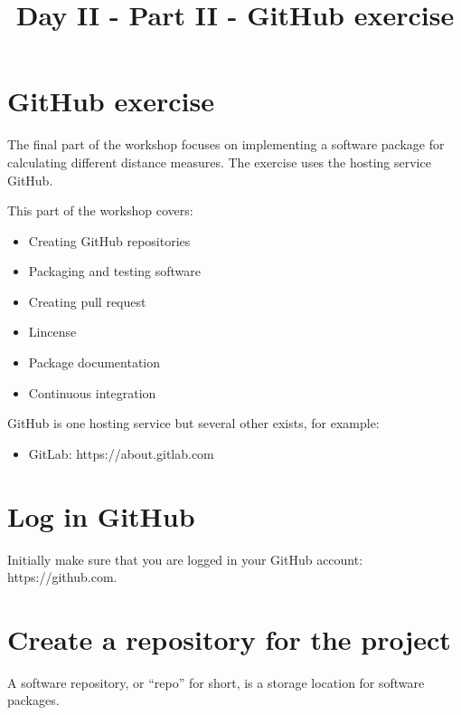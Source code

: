 \documentclass[11pt]{article}
\title{Day II - Part II - GitHub exercise}
\providecommand{\tightlist}{%
      \setlength{\itemsep}{0pt}\setlength{\parskip}{0pt}}
\begin{document}
    
    \maketitle
    
    

    
    \hypertarget{github-exercise}{%
\section{GitHub exercise}\label{github-exercise}}

The final part of the workshop focuses on implementing a software
package for calculating different distance measures. The exercise uses
the hosting service GitHub.

This part of the workshop covers:

\begin{itemize}
\tightlist
\item
  Creating GitHub repositories
\item
  Packaging and testing software
\item
  Creating pull request
\item
  Lincense
\item
  Package documentation
\item
  Continuous integration
\end{itemize}

    GitHub is one hosting service but several other exists, for example:

\begin{itemize}
\tightlist
\item
  GitLab: https://about.gitlab.com
\end{itemize}

    \hypertarget{log-in-github}{%
\section{Log in GitHub}\label{log-in-github}}

Initially make sure that you are logged in your GitHub account:
https://github.com.

    \hypertarget{create-a-repository-for-the-project}{%
\section{Create a repository for the
project}\label{create-a-repository-for-the-project}}

    A software repository, or ``repo'' for short, is a storage location for
software packages.
\end{document}
